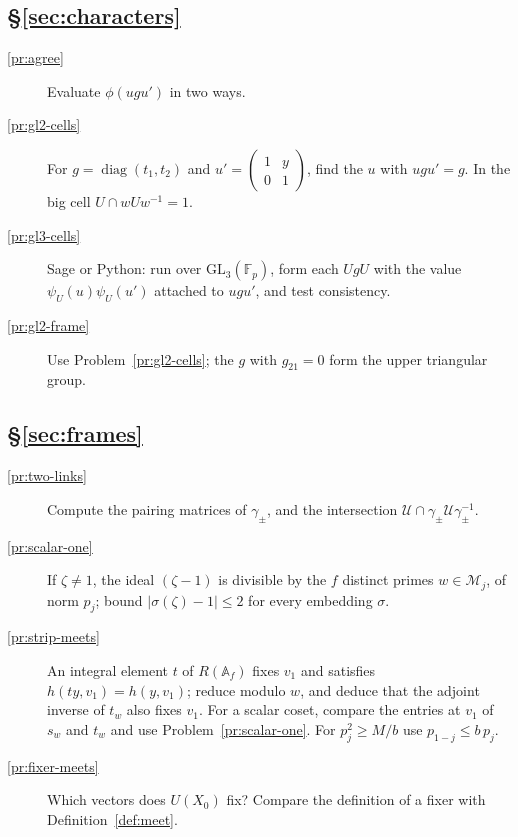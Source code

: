 \documentclass[reqno]{amsart}
\theoremstyle{definition}
\theoremstyle{plain}
\theoremstyle{remark}
\newcommand{\F}{{\mathbb{F}}}
\newcommand{\A}{\mathbb A}
\newcommand{\Uc}{{\mathcal{U}}}
\newcommand{\cMc}{\mathcal M}
\newcommand{\GL}{\mathrm{GL}}
\newcommand{\diag}{\operatorname{diag}}
\begin{document}
\subsection*{\S\ref{sec:characters}}
\begin{description}
\item[\ref{pr:agree}] Evaluate \(\phi(ugu')\) in two ways.
\item[\ref{pr:gl2-cells}] For \(g=\diag(t_1,t_2)\) and \(u'=\left(\begin{smallmatrix}1&y\\0&1\end{smallmatrix}\right)\), find the \(u\) with \(ugu'=g\).  In the big cell \(U\cap wUw^{-1}=1\).
\item[\ref{pr:gl3-cells}] Sage or Python: run over \(\GL_3(\F_p)\), form each \(UgU\) with the value \(\psi_U(u)\psi_U(u')\) attached to \(ugu'\), and test consistency.
\item[\ref{pr:gl2-frame}] Use Problem~\ref{pr:gl2-cells}; the \(g\) with \(g_{21}=0\) form the upper triangular group.
\end{description}

\subsection*{\S\ref{sec:frames}}
\begin{description}
\item[\ref{pr:two-links}] Compute the pairing matrices of \(\gamma_\pm\), and the intersection \(\Uc\cap\gamma_\pm\Uc\gamma_\pm^{-1}\).
\item[\ref{pr:scalar-one}] If \(\zeta\ne1\), the ideal \((\zeta-1)\) is divisible by the \(f\) distinct primes \(w\in\cMc_j\), of norm \(p_j\); bound \(\lvert\sigma(\zeta)-1\rvert\le2\) for every embedding \(\sigma\).
\item[\ref{pr:strip-meets}] An integral element \(t\) of \(R(\A_f)\) fixes \(v_1\) and satisfies \(h(ty,v_1)=h(y,v_1)\); reduce modulo \(w\), and deduce that the adjoint inverse of \(t_w\) also fixes \(v_1\).  For a scalar coset, compare the entries at \(v_1\) of \(s_w\) and \(t_w\) and use Problem~\ref{pr:scalar-one}.  For \(p_j^2\ge M/b\) use \(p_{1-j}\le b\,p_j\).
\item[\ref{pr:fixer-meets}] Which vectors does \(U(X_0)\) fix?  Compare the definition of a fixer with Definition~\ref{def:meet}.
\end{description}
\end{document}
